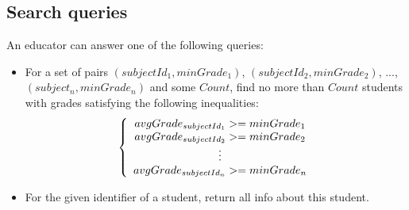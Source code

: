 \subsection{Search queries}

An educator can answer one of the following queries:
\begin{itemize}
\item For a set of pairs $(subjectId_1, minGrade_1)$, $(subjectId_2, minGrade_2)$, ..., $(subject_n, minGrade_n)$ and some $Count$, find no more than $Count$  students with grades satisfying the following inequalities:
\[
\left\{
\begin{array}{c}
avgGrade_{subjectId_1} >= minGrade_1 \\ avgGrade_{subjectId_2} >= minGrade_2 \\
\mathrel{\makebox[\widthof{=}]{\vdots}} \\ avgGrade_{subjectId_n} >= minGrade_n
\end{array}
\right.
\]

\item For the given identifier of a student, return all info about this student.
\end{itemize}